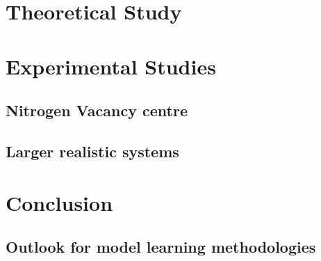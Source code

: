 \part{Theoretical Study}\label{part:theoretical_study}

\part{Experimental Studies}\label{part:experimental_study}
    \chapter{Nitrogen Vacancy centre}\label{chapter:nv}
        
    \chapter{Larger realistic systems}\label{chapter:many_qubits}
        
    
\part{Conclusion}\label{part:conclusion}
    \chapter{Outlook for model learning methodologies}\label{chapter:outlook}
        



